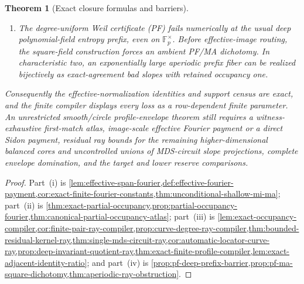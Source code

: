 \documentclass[12pt,a4paper]{amsart}
\numberwithin{equation}{section}
\newtheorem{theorem}{Theorem}[section]
\theoremstyle{remark}
\newcommand{\F}{\mathbb F}
\begin{document}
\begin{theorem}[Exact closure formulas and barriers]
\begin{enumerate}[label=\textup{(\roman*)},leftmargin=*]
      cells have the unconditional direct payments
      \textup{(RC$_{\rm ker}$)}, \textup{(RC$_{\rm circ}$)},
      \textup{(RC$_{\rm loc}$)}, and \textup{(RC$_{\rm quot}$)}.
\item The degree-uniform Weil certificate \textup{(PF)} fails numerically
      at the usual deep polynomial-field entropy prefix, even on
      \(\F_p^\times\).  Before effective-image routing, the square-field
      construction forces an ambient PF/MA dichotomy.  In characteristic
      two, an exponentially large aperiodic prefix fiber can be realized
      bijectively as exact-agreement bad slopes with retained occupancy one.
\end{enumerate}
Consequently the effective-normalization identities and support census are
exact, and the finite compiler displays every loss as a row-dependent
finite parameter.  An unrestricted smooth/circle profile-envelope theorem
still requires a witness-exhaustive first-match atlas, image-scale
effective Fourier payment or a direct Sidon payment, residual ray bounds
for the remaining higher-dimensional balanced cores and uncontrolled
unions of MDS-circuit slope projections, complete envelope domination, and
the target and lower reserve comparisons.
\end{theorem}

\begin{proof}
Part~\textup{(i)} is
\cref{lem:effective-span-fourier,def:effective-fourier-payment,cor:exact-finite-fourier-constants,thm:unconditional-shallow-mi-ma};
part~\textup{(ii)} is
\cref{thm:exact-partial-occupancy,prop:partial-occupancy-fourier,thm:canonical-partial-occupancy-atlas};
part~\textup{(iii)} is
\cref{lem:exact-occupancy-compiler,cor:finite-pair-ray-compiler,prop:curve-degree-ray-compiler,thm:bounded-residual-kernel-ray,thm:single-mds-circuit-ray,cor:automatic-locator-curve-ray,prop:deep-invariant-quotient-ray,thm:exact-finite-profile-compiler,lem:exact-adjacent-identity-ratio};
and part~\textup{(iv)} is
\cref{prop:pf-deep-prefix-barrier,prop:pf-ma-square-dichotomy,thm:aperiodic-ray-obstruction}.
\end{proof}
\end{document}
